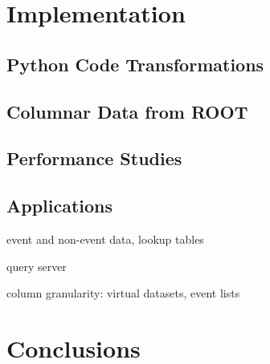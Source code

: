\documentclass[10pt, conference, compsocconf]{IEEEtran}
\begin{document}
\section{Implementation}

\subsection{Python Code Transformations}

\subsection{Columnar Data from ROOT}

\subsection{Performance Studies}

\subsection{Applications}

event and non-event data, lookup tables

query server

column granularity: virtual datasets, event lists

\section{Conclusions}



\end{document}
